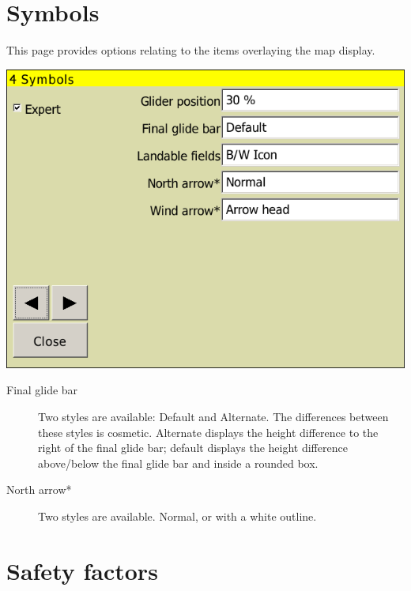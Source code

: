 


\clearpage
\section{Symbols}\label{sec:symbols}

This page provides options relating to the items overlaying the map display.

\begin{center}
\includegraphics[angle=0,width=0.8\linewidth,keepaspectratio='true']{figures/config-symbols.png}
\end{center}

\begin{description}


\item[Final glide bar]  Two styles are available: Default and
Alternate. The differences between these styles is cosmetic.  Alternate displays the height difference to the 
right of the final glide bar; default displays the height difference above/below the final glide bar and inside a 
rounded box.

\item[North arrow*]  Two styles are available.  Normal, or with a white outline.
\end{description}

\section{Safety factors}

